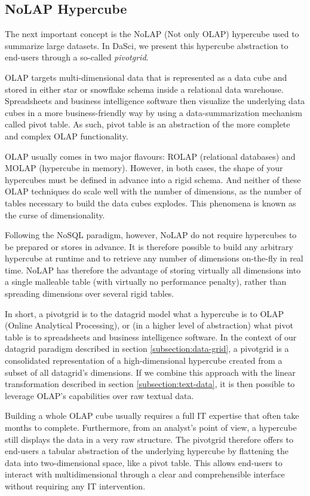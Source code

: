 \documentclass[10pt, a4paper, twocolumn]{article} %
\begin{document}
\subsection{NoLAP Hypercube}
\label{subsection:pivot-grid}

The next important concept is the NoLAP (Not only OLAP) hypercube \cite{cell} used to summarize large datasets. In DaSci, we present this hypercube abstraction to end-users through a so-called \textit{pivotgrid}.

OLAP targets multi-dimensional data that is represented as a data cube and stored in either star or snowflake schema inside a relational data warehouse. Spreadsheets and business intelligence software then visualize the underlying data cubes in a more business-friendly way by using a data-summarization mechanism called pivot table. As such, pivot table is an abstraction of the more complete and complex OLAP functionality.

OLAP usually comes in two major flavours: ROLAP (relational databases) and MOLAP (hypercube in memory). However, in both cases, the shape of your hypercubes must be defined in advance into a rigid schema. And neither of these OLAP techniques do scale well with the number of dimensions, as the number of tables necessary to build the data cubes explodes. This phenomena is known as the curse of dimensionality.

Following the NoSQL paradigm, however, NoLAP do not require hypercubes to be prepared or stores in advance. 
It is therefore possible to build any arbitrary hypercube at runtime and to retrieve any number of dimensions on-the-fly in real time.
NoLAP has therefore the advantage of storing virtually all dimensions into a single malleable table (with virtually no performance penalty), rather than spreading dimensions over several rigid tables.

In short, a pivotgrid is to the datagrid model what a hypercube is to OLAP (Online Analytical Processing), or (in a higher level of abstraction) what pivot table is to spreadsheets and business intelligence software. 
In the context of our datagrid paradigm described in section \ref{subsection:data-grid}, a pivotgrid is a consolidated representation of a high-dimensional hypercube created from a subset of all datagrid's dimensions.
If we combine this approach with the linear transformation described in section \ref{subsection:text-data}, it is then possible to leverage OLAP's capabilities over raw textual data.

Building a whole OLAP cube usually requires a full IT expertise that often take months to complete. Furthermore, from an analyst's point of view, a hypercube still displays the data in a very raw structure. 
The pivotgrid therefore offers to end-users a tabular abstraction of the underlying hypercube by flattening the data into two-dimensional space, like a pivot table.
This allows end-users to interact with multidimensional through a clear and comprehensible interface without requiring any IT intervention. 
\end{document}

